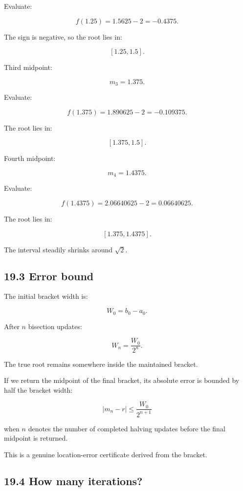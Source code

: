 Evaluate:

\[ f(1.25)=1.5625-2=-0.4375. \]

The sign is negative, so the root lies in:

\[ [1.25,1.5]. \]

Third midpoint:

\[ m_3=1.375. \]

Evaluate:

\[ f(1.375)=1.890625-2=-0.109375. \]

The root lies in:

\[ [1.375,1.5]. \]

Fourth midpoint:

\[ m_4=1.4375. \]

Evaluate:

\[ f(1.4375)=2.06640625-2=0.06640625. \]

The root lies in:

\[ [1.375,1.4375]. \]

The interval steadily shrinks around \(\sqrt2\).

\subsection{19.3 Error bound}\label{02-foundations-ii-ch028-error-bound}

\hypertarget{02-foundations-ii-ch028-error-bound}{}

The initial bracket width is:

\[ W_0=b_0-a_0. \]

After \(n\) bisection updates:

\[ \boxed{ W_n=\frac{W_0}{2^n} }. \]

The true root remains somewhere inside the maintained bracket.

If we return the midpoint of the final bracket, its absolute error is bounded by half the bracket width:

\[ \boxed{ |m_n-r| \le \frac{W_0}{2^{n+1}} } \]

when \(n\) denotes the number of completed halving updates before the final midpoint is returned.

This is a genuine location-error certificate derived from the bracket.

\subsection{19.4 How many iterations?}\label{02-foundations-ii-ch028-how-many-iterations}

